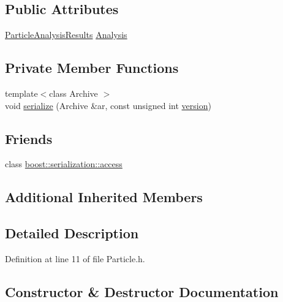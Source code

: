 \subsection*{Public Attributes}
\begin{DoxyCompactItemize}
\item 
\hyperlink{class_soil_analyzer_1_1_particle_analysis_results}{Particle\+Analysis\+Results} \hyperlink{class_soil_analyzer_1_1_particle_a4df8d4d8fb130bce05fef5d4601ef89e}{Analysis}
\end{DoxyCompactItemize}
\subsection*{Private Member Functions}
\begin{DoxyCompactItemize}
\item 
{\footnotesize template$<$class Archive $>$ }\\void \hyperlink{class_soil_analyzer_1_1_particle_adf8333262eab916769156f8c324e5a28}{serialize} (Archive \&ar, const unsigned int \hyperlink{class_soil_analyzer_1_1_soil_ac32132912c73338edf60b5cd6de4feb8}{version})
\end{DoxyCompactItemize}
\subsection*{Friends}
\begin{DoxyCompactItemize}
\item 
class \hyperlink{class_soil_analyzer_1_1_particle_ac98d07dd8f7b70e16ccb9a01abf56b9c}{boost\+::serialization\+::access}
\end{DoxyCompactItemize}
\subsection*{Additional Inherited Members}


\subsection{Detailed Description}


Definition at line 11 of file Particle.\+h.



\subsection{Constructor \& Destructor Documentation}
\hypertarget{class_soil_analyzer_1_1_particle_ac01adbc5a4a30350985c0076da52e7da}{}
